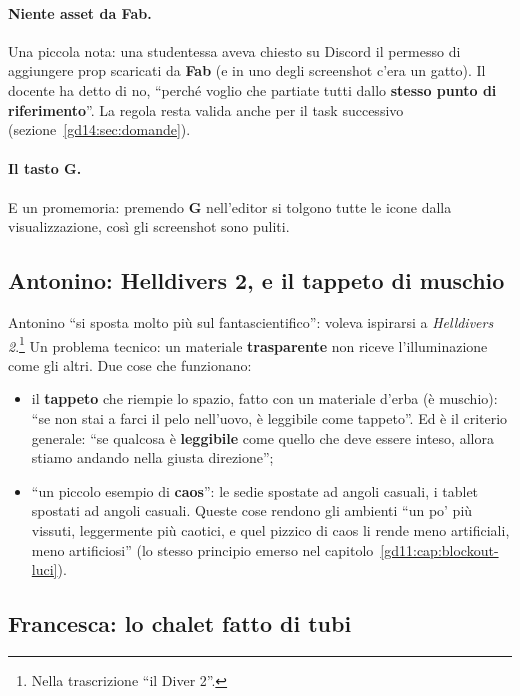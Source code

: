 \paragraph{Niente asset da Fab.} Una piccola nota: una studentessa aveva chiesto su
Discord il permesso di aggiungere prop scaricati da \textbf{Fab} (e in uno degli
screenshot c'era un gatto). Il docente ha detto di no, ``perché voglio che partiate
tutti dallo \textbf{stesso punto di riferimento}''. La regola resta valida anche per
il task successivo (sezione~\ref{gd14:sec:domande}).

\paragraph{Il tasto G.} E un promemoria: premendo \textbf{G} nell'editor si tolgono
tutte le icone dalla visualizzazione, così gli screenshot sono puliti.

\subsection{Antonino: Helldivers 2, e il tappeto di muschio}

Antonino ``si sposta molto più sul fantascientifico'': voleva ispirarsi a
\emph{Helldivers 2}.\footnote{Nella trascrizione ``il Diver 2''.} Un problema
tecnico: un materiale \textbf{trasparente} non riceve l'illuminazione come gli
altri. Due cose che funzionano:
\begin{itemize}
  \item il \textbf{tappeto} che riempie lo spazio, fatto con un materiale d'erba (è
        muschio): ``se non stai a farci il pelo nell'uovo, è leggibile come
        tappeto''. Ed è il criterio generale: ``se qualcosa è
        \textbf{leggibile} come quello che deve essere inteso, allora stiamo
        andando nella giusta direzione'';
  \item ``un piccolo esempio di \textbf{caos}'': le sedie spostate ad angoli
        casuali, i tablet spostati ad angoli casuali. Queste cose rendono gli
        ambienti ``un po' più vissuti, leggermente più caotici, e quel pizzico
        di caos li rende meno artificiali, meno artificiosi'' (lo stesso
        principio emerso nel capitolo~\ref{gd11:cap:blockout-luci}).
\end{itemize}

\subsection{Francesca: lo chalet fatto di tubi}


